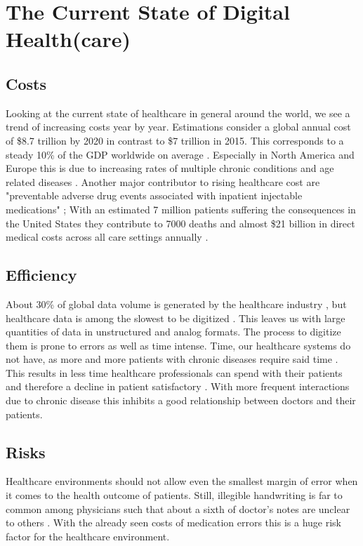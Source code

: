 \section{The Current State of Digital Health(care)}
\subsection{Costs}
Looking at the current state of healthcare in general around the world, we see a trend of increasing costs year by year. Estimations consider a global annual cost of \$8.7 trillion by 2020 in contrast to \$7 trillion in 2015. This corresponds to a steady 10\% of the GDP worldwide on average \cite{EIU2016}. Especially in North America and Europe this is due to increasing rates of multiple chronic conditions and age related diseases \cite{sambamoorthi2015multiple}. Another major contributor to rising healthcare cost are "preventable adverse drug events associated with inpatient injectable medications" \cite{lahue2012national}; With an estimated 7 million patients suffering the consequences in the United States they contribute to 7000 deaths and almost \$21 billion in direct medical costs across all care settings annually \cite{prevMedErrors}.
\subsection{Efficiency}
About 30\% of global data volume is generated by the healthcare industry \cite{gopal2019digital}, but healthcare data is among the slowest to be digitized \cite{industryDigitalization}. This leaves us with large quantities of data in unstructured and analog formats. The process to digitize them is prone to errors as well as time intense. Time, our healthcare systems do not have, as more and more patients with chronic diseases require said time \cite{ostbye2005there}. This results in less time healthcare professionals can spend with their patients \cite{fuchtbauer2013emergency} and therefore a decline in patient satisfactory \cite{gross1998patient}. With more frequent interactions due to chronic disease this inhibits a good relationship between doctors and their patients.
\subsection{Risks}
Healthcare environments should not allow even the smallest margin of error when it comes to the health outcome of patients. Still, illegible handwriting is far to common among physicians such that about a sixth of doctor's notes are unclear to others \cite{rodriguez2002illegible}. With the already seen costs of medication errors this is a huge risk factor for the healthcare environment.

